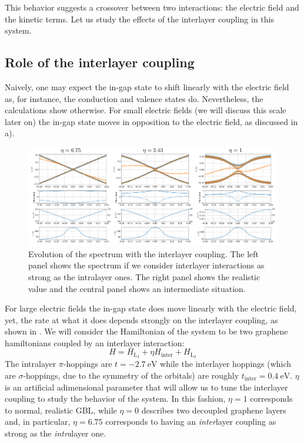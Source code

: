 This behavior suggests a crossover between two interactions: the electric field and the kinetic terms. Let us study the effects of the interlayer coupling in this system.


\subsection{Role of the interlayer coupling}
Naively, one may expect the in-gap state to shift linearly with the electric field as, for instance, the conduction and valence states do. Nevertheless, the calculations show otherwise.
For small electric fields (we will discuss this scale later on) the in-gap state moves in opposition to the electric field, as discussed in a).
\begin{figure}[!ht!]
\centering
\includegraphics{artlat/fig/ingap_interlayer.pdf}
\vspace{-15pt}
\caption{Evolution of the spectrum with the interlayer coupling. The left panel shows the spectrum if we consider interlayer interactions as strong as the intralayer ones. The right panel shows the realistic value and the central panel shows an intermediate situation.}
\label{ingap_interlayer}
\end{figure}
For large electric fields the in-gap state does move linearly with the electric field, yet, the rate at what it does depends strongly on the interlayer coupling, as shown in .
We will consider the Hamiltonian of the system to be two graphene hamiltonians coupled by an interlayer interaction:
\begin{equation}
  H = H_{\text{L}_1} + \eta H_{\text{inter}} + H_{\text{L}_2}
\end{equation}
The intralayer $\pi$-hoppings are $t=\SI{-2.7}{\eV}$ while the interlayer hoppings (which are $\sigma$-hoppings, due to the symmetry of the orbitals) are roughly $t_{\text{inter}}=\SI{0.4}{\eV}$. $\eta$ is an artificial adimensional parameter that will allow us to tune the interlayer coupling to study the behavior of the system. In this fashion, $\eta=1$ corresponds to normal, realistic GBL, while $\eta=0$ describes two decoupled graphene layers and, in particular, $\eta=6.75$ corresponds to having an \emph{inter}layer coupling as strong as the \emph{intra}layer one.\\

